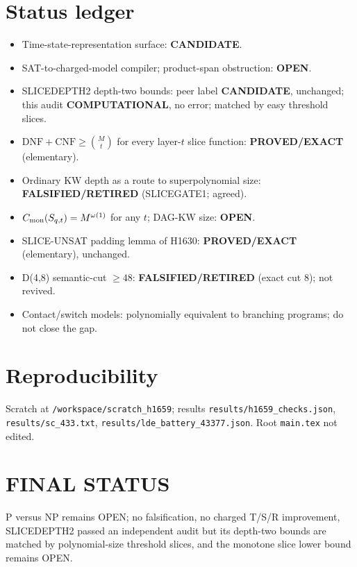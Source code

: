 \documentclass[11pt]{article}
\begin{document}
\section*{Status ledger}
\begin{itemize}
\item Time-state-representation surface: \textbf{CANDIDATE}.
\item SAT-to-charged-model compiler; product-span obstruction: \textbf{OPEN}.
\item SLICEDEPTH2 depth-two bounds: peer label \textbf{CANDIDATE}, unchanged; this audit \textbf{COMPUTATIONAL}, no error; matched by easy threshold slices.
\item $\mathrm{DNF}+\mathrm{CNF}\ge\binom Mt$ for every layer-$t$ slice function: \textbf{PROVED/EXACT} (elementary).
\item Ordinary KW depth as a route to superpolynomial size: \textbf{FALSIFIED/RETIRED} (SLICEGATE1; agreed).
\item $C_{\rm mon}(S_{q,t})=M^{\omega(1)}$ for any $t$; DAG-KW size: \textbf{OPEN}.
\item SLICE-UNSAT padding lemma of H1630: \textbf{PROVED/EXACT} (elementary), unchanged.
\item D(4,8) semantic-cut $\ge48$: \textbf{FALSIFIED/RETIRED} (exact cut 8); not revived.
\item Contact/switch models: polynomially equivalent to branching programs; do not close the gap.
\end{itemize}

\section*{Reproducibility}
Scratch at \texttt{/workspace/scratch\_h1659}; results \texttt{results/h1659\_checks.json}, \texttt{results/sc\_433.txt},
\texttt{results/lde\_battery\_43377.json}. Root \texttt{main.tex} not edited.

\section*{FINAL STATUS}
P versus NP remains OPEN; no falsification, no charged T/S/R improvement, SLICEDEPTH2 passed an independent audit but its
depth-two bounds are matched by polynomial-size threshold slices, and the monotone slice lower bound remains OPEN.
\end{document}
